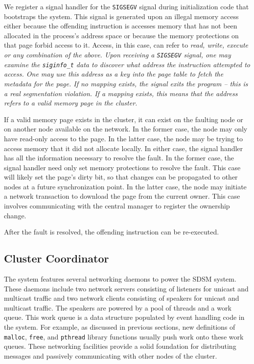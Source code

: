 We register a signal handler for the \verb,SIGSEGV, signal during initialization code that bootstraps the \projname{} system.  This signal is generated upon an illegal memory access either because the offending instruction is accesses memory that has not been allocated in the process's address space or because the memory protections on that page forbid access to it.  Access, in this case, can refer to \em read\em, \em write\em, \em execute \em or any combination of the above.  Upon receiving a \verb,SIGSEGV, signal, one may examine the \verb,siginfo_t, data to discover what address the instruction attempted to access.  One may use this address as a key into the page table to fetch the metadata for the page.  If no mapping exists, the signal exits the program -- this is a real segmentation violation.  If a mapping exists, this means that the address refers to a valid memory page in the cluster.

If a valid memory page exists in the cluster, it can exist on the faulting node or on another node available on the network.  In the former case, the node may only have read-only access to the page.  In the latter case, the node may be trying to access memory that it did not allocate locally.  In either case, the signal handler has all the information necessary to resolve the fault.  In the former case, the signal handler need only set memory protections to resolve the fault.  This case will likely set the page's dirty bit, so that changes can be propagated to other nodes at a future synchronization point.  In the latter case, the node may initiate a network transaction to download the page from the current owner.  This case involves communicating with the central manager to register the ownership change.

After the fault is resolved,  the offending instruction can be re-executed.

\subsection{Cluster Coordinator}
\label{cluster-coordinator}

The \projname{} system features several networking daemons to power the SDSM system.  These daemons include two network servers consisting of listeners for unicast and multicast traffic and two network clients consisting of speakers for unicast and multicast traffic.  The speakers are powered by a pool of threads and a work queue.  This work queue is a data structure populated by event handling code in the system.  For example, as discussed in previous sections, new definitions of \verb,malloc,, \verb,free,, and \verb,pthread, library functions usually push work onto these work queues.  These networking facilities provide a solid foundation for distributing messages and passively communicating with other nodes of the cluster.

